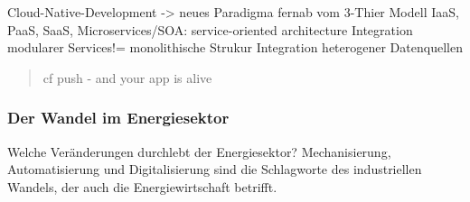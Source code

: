 Cloud-Native-Development -> neues Paradigma fernab vom 3-Thier Modell
IaaS, PaaS, SaaS, Microservices/SOA: service-oriented architecture
Integration modularer Services!= monolithische Strukur
Integration heterogener Datenquellen

\begin{quotation}
  cf push - and your app is alive
\end{quotation}


\subsubsection{Der Wandel im Energiesektor}
Welche Veränderungen durchlebt der Energiesektor?
Mechanisierung, Automatisierung und Digitalisierung sind die Schlagworte des industriellen Wandels, der auch die Energiewirtschaft betrifft.


